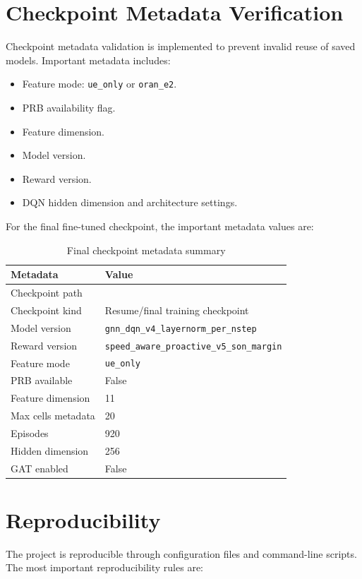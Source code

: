 \documentclass[12pt,a4paper]{report}
\newcommand{\ueonly}{\texttt{ue\_only}}
\newcommand{\orane}{\texttt{oran\_e2}}
\begin{document}
\section{Checkpoint Metadata Verification}
Checkpoint metadata validation is implemented to prevent invalid reuse of saved models. Important metadata includes:

\begin{itemize}
    \item Feature mode: \ueonly{} or \orane.
    \item PRB availability flag.
    \item Feature dimension.
    \item Model version.
    \item Reward version.
    \item DQN hidden dimension and architecture settings.
\end{itemize}

For the final fine-tuned checkpoint, the important metadata values are:

\begin{table}[H]
\centering
\caption{Final checkpoint metadata summary}
\begin{tabularx}{\textwidth}{p{}Y}
\toprule
\textbf{Metadata} & \textbf{Value}\\
\midrule
Checkpoint path & \\
Checkpoint kind & Resume/final training checkpoint\\
Model version & \texttt{gnn\_dqn\_v4\_layernorm\_per\_nstep}\\
Reward version & \texttt{speed\_aware\_proactive\_v5\_son\_margin}\\
Feature mode & \ueonly\\
PRB available & False\\
Feature dimension & 11\\
Max cells metadata & 20\\
Episodes & 920\\
Hidden dimension & 256\\
GAT enabled & False\\
\bottomrule
\end{tabularx}
\end{table}

\section{Reproducibility}
The project is reproducible through configuration files and command-line scripts. The most important reproducibility rules are:
\end{document}
